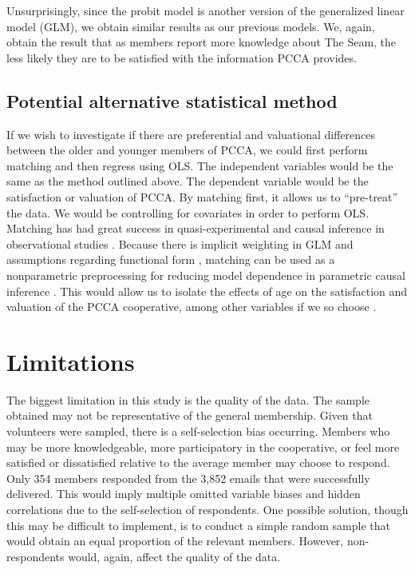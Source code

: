 \documentclass[a4paper]{article}
\begin{document}
Unsurprisingly, since the probit model is another version of the generalized linear model (GLM), we obtain similar results as our previous models. We, again, obtain the result that as members report more knowledge about The Seam, the less likely they are to be satisfied with the information PCCA provides.

\subsection{Potential alternative statistical method}

If we wish to investigate if there are preferential and valuational differences between the older and younger members of PCCA, we could first perform matching and then regress using OLS. The independent variables would be the same as the method outlined above. The dependent variable would be the satisfaction or valuation of PCCA. By matching first, it allows us to “pre-treat” the data. We would be controlling for covariates in order to perform OLS. Matching has had great success in quasi-experimental and causal inference in observational studies \citep{lalondeEvaluatingEconometricEvaluations1986,dehejiaPropensityScoreMatchingMethods2002a}. Because there is implicit weighting in GLM \citep{aronowDoesRegressionProduce2016} and assumptions regarding functional form \citep{kingDangersExtremeCounterfactuals2006}, matching can be used as a nonparametric preprocessing for reducing model dependence in parametric causal inference \citep{hoMatchingNonparametricPreprocessing2007}. This would allow us to isolate the effects of age on the satisfaction and valuation of the PCCA cooperative, among other variables if we so choose \citep{stuartMatchingMethodsCausal2010a}. 

\section{Limitations}

The biggest limitation in this study is the quality of the data. The sample obtained may not be representative of the general membership. Given that volunteers were sampled, there is a self-selection bias occurring. Members who may be more knowledgeable, more participatory in the cooperative, or feel more satisfied or dissatisfied relative to the average member may choose to respond. Only 354 members responded from the 3,852 emails that were successfully delivered. This would imply multiple omitted variable biases and hidden correlations due to the self-selection of respondents. One possible solution, though this may be difficult to implement, is to conduct a simple random sample that would obtain an equal proportion of the relevant members. However, non-respondents would, again, affect the quality of the data.
\end{document}
